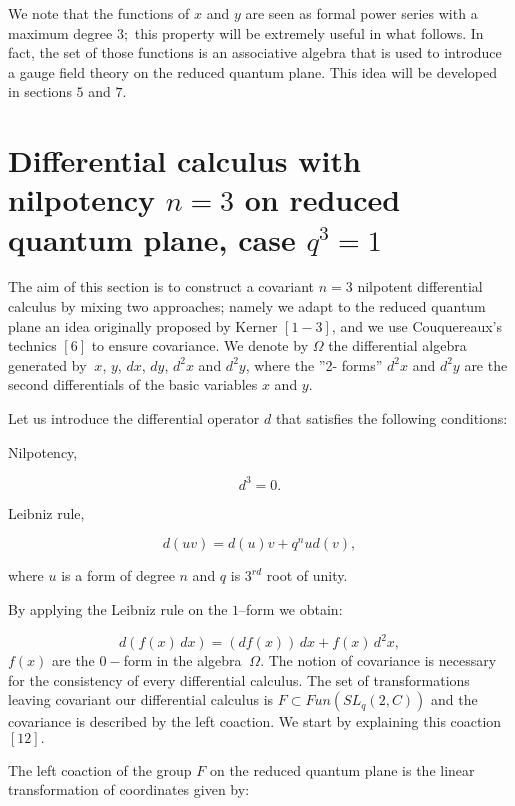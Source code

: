 \documentclass[a4paper,12pt,thmsa]{article}
\begin{document}
We note that the functions of $x$ and $y$ are seen as formal power series
with a maximum degree $3;$ this property will be extremely useful in what
follows. In fact, the set of those functions is an associative algebra that
is used to introduce a gauge field theory on the reduced quantum plane. This
idea will be developed in sections $5$ and $7$.

\section{Differential calculus with nilpotency $n=3$ on reduced quantum
plane, case $q^3=1$}

The aim of this section is to construct a covariant $n=3$ nilpotent
differential calculus by mixing two approaches; namely we adapt to the
reduced quantum plane an idea originally proposed by Kerner $[1-3]$, and we
use Couquereaux's technics $[6]$ to ensure covariance. We denote by $\Omega $
the differential algebra generated by $\ x$, $y$, $dx$, $dy$, $d^2x$ and $%
d^2y$, where the ''2- forms'' $d^2x$ and $d^2y$ are the second differentials
of the basic variables $x$ and $y$.

Let us introduce the differential operator $d$ that satisfies the following
conditions:

Nilpotency,

\begin{equation}
d^3=0.
\end{equation}

Leibniz rule,

\begin{equation}
d(uv)=d(u)v+q^nud(v),
\end{equation}

where $u$ is a form of degree $n$ and $q$ is $3^{rd}$ root of unity.

By applying the Leibniz rule on the $1$--form we obtain:

\begin{equation}
d(f(x)\, dx)=(df(x))\, dx+f(x)\, d^2x,
\end{equation}
$f(x)$ are the $0-$form in the algebra $\ \Omega $. The notion of covariance
is necessary for the consistency of every differential calculus. The set of
transformations leaving covariant our differential calculus is $F\subset
Fun(SL_q(2,C))$ and the covariance is described by the left coaction. We
start by explaining this coaction $\left[ 12\right] .$

The left coaction of the group $F$ on the reduced quantum plane is the
linear transformation of coordinates given by:
\end{document}
